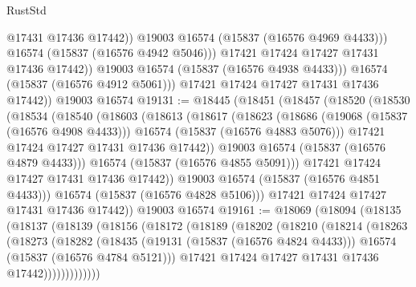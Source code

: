\begin{lexlean}{RustStd}
\begin{coremodule}
                        @17431
                        @17436
                        @17442))
                    @19003
                    @16574
                    (@15837 (@16576 @4969 @4433)))
                  @16574
                  (@15837 (@16576 @4942 @5046)))
                @17421
                @17424
                @17427
                @17431
                @17436
                @17442))
            @19003
            @16574
            (@15837 (@16576 @4938 @4433)))
          @16574
          (@15837 (@16576 @4912 @5061)))
        @17421
        @17424
        @17427
        @17431
        @17436
        @17442))
    @19003
    @16574
@19131 := @18445
    (@18451
      (@18457
        (@18520
          (@18530
            (@18534
              (@18540
                (@18603
                  (@18613
                    (@18617
                      (@18623
                        (@18686
                          (@19068 (@15837 (@16576 @4908 @4433)))
                          @16574
                          (@15837 (@16576 @4883 @5076)))
                        @17421
                        @17424
                        @17427
                        @17431
                        @17436
                        @17442))
                    @19003
                    @16574
                    (@15837 (@16576 @4879 @4433)))
                  @16574
                  (@15837 (@16576 @4855 @5091)))
                @17421
                @17424
                @17427
                @17431
                @17436
                @17442))
            @19003
            @16574
            (@15837 (@16576 @4851 @4433)))
          @16574
          (@15837 (@16576 @4828 @5106)))
        @17421
        @17424
        @17427
        @17431
        @17436
        @17442))
    @19003
    @16574
@19161 := @18069
    (@18094
      (@18135
        (@18137
          (@18139
            (@18156
              (@18172
                (@18189
                  (@18202
                    (@18210
                      (@18214
                        (@18263
                          (@18273
                            (@18282
                              (@18435
                                (@19131 (@15837 (@16576 @4824 @4433)))
                                @16574
                                (@15837 (@16576 @4784 @5121)))
                              @17421
                              @17424
                              @17427
                              @17431
                              @17436
                              @17442)))))))))))))

\end{coremodule}
\end{lexlean}
